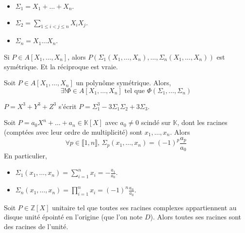   \begin{example}
    \begin{itemize}
      \item $\Sigma_1 = X_1 + \dots + X_n$.
      \item $\Sigma_2 = \sum_{1 \leq i < j \leq n} X_i X_j$.
      \item $\Sigma_n = X_1 \dots X_n$.
    \end{itemize}
  \end{example}

  \begin{remark}
    Si $P \in A[X_1, \dots, X_n]$, alors $P(\Sigma_1(X_1, \dots, X_n), \dots, \Sigma_n(X_1, \dots, X_n))$ est symétrique. Et la réciproque est vraie.
  \end{remark}

  \begin{theorem}
    Soit $P \in A[X_1, \dots, X_n]$ un polynôme symétrique. Alors,
    \[ \exists! \Phi \in A[X_1, \dots, X_n] \text{ tel que } \Phi(\Sigma_1, \dots, \Sigma_n) \]
  \end{theorem}

  \begin{example}
    $P = X^3 + Y^3 + Z^3$ s'écrit $P = \Sigma_1^3 - 3 \Sigma_1 \Sigma_2 + 3 \Sigma_3$.
  \end{example}


  \begin{application}
    Soit $P = a_0X^n + \dots + a_n \in \mathbb{K}[X]$ avec $a_0 \neq 0$ scindé sur $\mathbb{K}$, dont les racines (comptées avec leur ordre de multiplicité) sont $x_1, \dots, x_n$. Alors
    \[ \forall p \in \llbracket 1, n \rrbracket, \, \Sigma_p(x_1, \dots, x_n) = (-1)^p \frac{a_p}{a_0} \]
    En particulier,
    \begin{itemize}
      \item $\Sigma_1(x_1, \dots, x_n) = \sum_{i=1}^n x_i = -\frac{a_1}{a_0}$.
      \item $\Sigma_n(x_1, \dots, x_n) = \prod_{i=1}^n x_i = (-1)^n \frac{a_n}{a_0}$.
    \end{itemize}
  \end{application}


  \begin{application}
    Soit $P \in \mathbb{Z}[X]$ unitaire tel que toutes ses racines complexes appartiennent au disque unité épointé en l'origine (que l'on note $D$). Alors toutes ses racines sont des racines de l'unité.
  \end{application}

